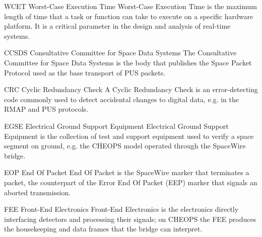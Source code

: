 %
  {WCET}%
  {Worst-Case Execution Time}%
  {Worst-Case Execution Time is the maximum length of time that a task or
   function can take to execute on a specific hardware platform. It is a
   critical parameter in the design and analysis of real-time systems.}%



%
  {CCSDS}%
  {Consultative Committee for Space Data Systems}%
  {The Consultative Committee for Space Data Systems is the body that publishes %
   the Space Packet Protocol used as the base transport of \gls{PUS} packets.}%

%
  {CRC}%
  {Cyclic Redundancy Check}%
  {A Cyclic Redundancy Check is an error-detecting code commonly used to detect %
   accidental changes to digital data, e.g. in the \gls{RMAP} and \gls{PUS} %
   protocols.}%

%
  {EGSE}%
  {Electrical Ground Support Equipment}%
  {Electrical Ground Support Equipment is the collection of test and support %
   equipment used to verify a space segment on ground, e.g. the CHEOPS model %
   operated through the SpaceWire bridge.}%

%
  {EOP}%
  {End Of Packet}%
  {End Of Packet is the \gls{SpaceWire} marker that terminates a packet, the %
   counterpart of the Error End Of Packet (EEP) marker that signals an %
   aborted transmission.}%

%
  {FEE}%
  {Front-End Electronics}%
  {Front-End Electronics is the electronics directly interfacing detectors and %
   processing their signals; on CHEOPS the FEE produces the housekeeping and %
   data frames that the bridge can interpret.}%



